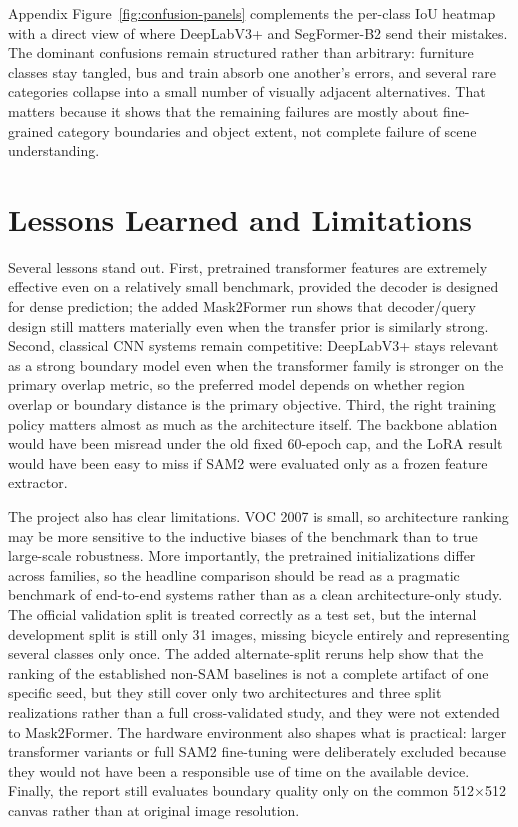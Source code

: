 \documentclass{article}
\begin{document}
Appendix Figure~\ref{fig:confusion-panels} complements the per-class IoU heatmap with a direct view of where DeepLabV3+ and SegFormer-B2 send their mistakes. The dominant confusions remain structured rather than arbitrary: furniture classes stay tangled, bus and train absorb one another's errors, and several rare categories collapse into a small number of visually adjacent alternatives. That matters because it shows that the remaining failures are mostly about fine-grained category boundaries and object extent, not complete failure of scene understanding.

\section{Lessons Learned and Limitations}

Several lessons stand out. First, pretrained transformer features are extremely effective even on a relatively small benchmark, provided the decoder is designed for dense prediction; the added Mask2Former run shows that decoder/query design still matters materially even when the transfer prior is similarly strong. Second, classical CNN systems remain competitive: DeepLabV3+ stays relevant as a strong boundary model even when the transformer family is stronger on the primary overlap metric, so the preferred model depends on whether region overlap or boundary distance is the primary objective. Third, the right training policy matters almost as much as the architecture itself. The backbone ablation would have been misread under the old fixed 60-epoch cap, and the LoRA result would have been easy to miss if SAM2 were evaluated only as a frozen feature extractor.

The project also has clear limitations. VOC 2007 is small, so architecture ranking may be more sensitive to the inductive biases of the benchmark than to true large-scale robustness. More importantly, the pretrained initializations differ across families, so the headline comparison should be read as a pragmatic benchmark of end-to-end systems rather than as a clean architecture-only study. The official validation split is treated correctly as a test set, but the internal development split is still only 31 images, missing bicycle entirely and representing several classes only once. The added alternate-split reruns help show that the ranking of the established non-SAM baselines is not a complete artifact of one specific seed, but they still cover only two architectures and three split realizations rather than a full cross-validated study, and they were not extended to Mask2Former. The hardware environment also shapes what is practical: larger transformer variants or full SAM2 fine-tuning were deliberately excluded because they would not have been a responsible use of time on the available device. Finally, the report still evaluates boundary quality only on the common \num{512}$\times$\num{512} canvas rather than at original image resolution.
\end{document}
